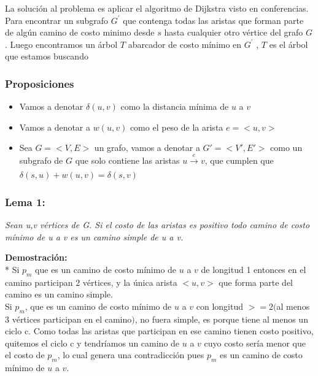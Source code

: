 \documentclass{article}
\begin{document}
    \noindent La soluci\'on al problema es aplicar el algoritmo de  Dijkstra visto en conferencias.
    Para encontrar un subgrafo $G^{'}$ que contenga todas las aristas que forman parte de alg\'un camino de 
    costo minimo desde $s$ hasta cualquier otro v\'ertice del grafo $G$. Luego encontramos un \'arbol $T$ abarcador de 
    costo m\'inimo en $G^{'}$ , $T$ es el \'arbol que estamos buscando 


    
    \subsubsection{Proposiciones }
    \begin{itemize}
        \item Vamos a denotar $\delta\left(u,v\right)$ como la distancia m\'inima de $u$ a $v$ 
        \item Vamos a denotar a $w(u,v)$ como el peso de la arista $e= <u,v>$ 
        \item Sea $G = <V,E>$ un grafo, vamos a denotar a $G' = <V',E'>$ como un subgrafo de $G$ que solo contiene las aristas $ u \xrightarrow[]{e} v$, 
        que cumplen que $\delta\left(s,u\right) + w \left(u,v\right) = \delta\left(s,v\right)$   
    \end{itemize}

    \subsubsection{Lema 1:}

    \textit{Sean u,v v\'ertices de G. Si el costo de las aristas es positivo todo camino de costo m\'inimo de u a v es un camino simple de u a v.}
    
    \vspace*{0.3cm} 

    
    \noindent \textbf{Demostraci\'on:}
    \\*
    Si $p_{m}$ que es un camino de costo m\'inimo de $u$ a $v$ de longitud 1 entonces en el camino participan 2 v\'ertices, y la \'unica arista $<u,v>$
    que forma parte del camino es un camino simple.\\ 
    Si $p_{m}$, que es un camino de costo m\'inimo de $u$ a $v$ con longitud $>=2$$($al menos 3 v\'ertices participan en el camino$)$, no fuera simple, es 
    porque tiene al menos un ciclo c. Como todas las aristas que participan en ese camino tienen costo positivo, quitemos el ciclo c y tendr\'iamos 
    un camino de $u$ a $v$ cuyo costo ser\'ia menor que el costo de $p_{m}$, lo cual genera
    una contradicci\'on pues $p_{m}$ es un camino de costo m\'inimo de $u$ a $v$.\\
    
\end{document}
